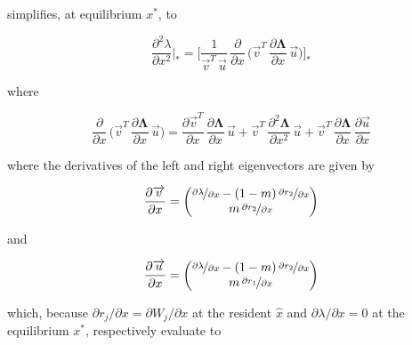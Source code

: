 simplifies, at equilibrium $x^*$, to

\begin{equation}
    \frac{\partial^2 \lambda}{\partial x^2}\bigg|_* = \Bigg[ \frac{1}{\overrightarrow{v}^T\,\overrightarrow{u}}\,\frac{\partial}{\partial x}\,\bigg(\overrightarrow{v}^T\,\frac{\partial \pmb{\Lambda}}{\partial x}\,\overrightarrow{u}\bigg) \Bigg]_*
    \label{eq:fitness_curvature_equilibrium}
\end{equation}

where

\begin{equation}
    \frac{\partial}{\partial x} \, \bigg(\overrightarrow{v}^T \, \frac{\partial \pmb{\Lambda}}{\partial x} \, \overrightarrow{u}\bigg) = \frac{\partial \overrightarrow{v}^T}{\partial x}\,\frac{\partial \pmb{\Lambda}}{\partial x}\,\overrightarrow{u} + \overrightarrow{v}^T\,\frac{\partial^2 \pmb{\Lambda}}{\partial x^2}\,\overrightarrow{u} + \overrightarrow{v}^T\,\frac{\partial \pmb{\Lambda}}{\partial x}\,\frac{\partial \overrightarrow{u}}{\partial x}
    \label{eq:deriv_num_gradient_unevaluated}
\end{equation}

where the derivatives of the left and right eigenvectors are given by

\begin{equation}
    \frac{\partial \overrightarrow{v}}{\partial x} = 
    \begin{pmatrix}
        \nicefrac{\partial \lambda}{\partial x} - (1-m)\,\nicefrac{\partial r_2}{\partial x}\\
        m\,\nicefrac{\partial r_2}{\partial x}
    \end{pmatrix}
\end{equation}

and

\begin{equation}
    \frac{\partial \overrightarrow{u}}{\partial x} = 
    \begin{pmatrix}
        \nicefrac{\partial \lambda}{\partial x} - (1-m)\,\nicefrac{\partial r_2}{\partial x}\\
        m\,\nicefrac{\partial r_1}{\partial x}
    \end{pmatrix}
\end{equation}

which, because $\partial r_j / \partial x = \partial W_j / \partial x$ at the resident $\hat x$ and $\partial \lambda / \partial x = 0$ at the equilibrium $x^*$, respectively evaluate to


